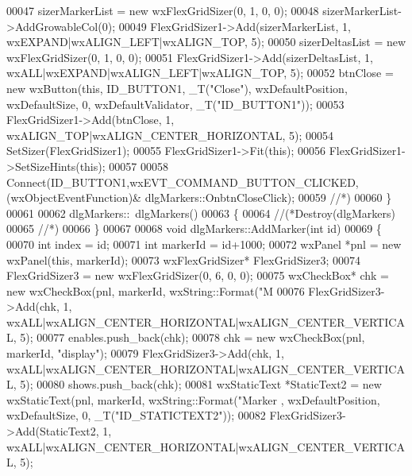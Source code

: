 \begin{DoxyCode}
00047     sizerMarkerList = \textcolor{keyword}{new} wxFlexGridSizer(0, 1, 0, 0);
00048     sizerMarkerList->AddGrowableCol(0);
00049     FlexGridSizer1->Add(sizerMarkerList, 1, wxEXPAND|wxALIGN\_LEFT|wxALIGN\_TOP, 5);
00050     sizerDeltasList = \textcolor{keyword}{new} wxFlexGridSizer(0, 1, 0, 0);
00051     FlexGridSizer1->Add(sizerDeltasList, 1, wxALL|wxEXPAND|wxALIGN\_LEFT|wxALIGN\_TOP, 5);
00052     btnClose = \textcolor{keyword}{new} wxButton(\textcolor{keyword}{this}, ID_BUTTON1, \_T(\textcolor{stringliteral}{"Close"}), wxDefaultPosition, wxDefaultSize, 0, 
      wxDefaultValidator, \_T(\textcolor{stringliteral}{"ID\_BUTTON1"}));
00053     FlexGridSizer1->Add(btnClose, 1, wxALIGN\_TOP|wxALIGN\_CENTER\_HORIZONTAL, 5);
00054     SetSizer(FlexGridSizer1);
00055     FlexGridSizer1->Fit(\textcolor{keyword}{this});
00056     FlexGridSizer1->SetSizeHints(\textcolor{keyword}{this});
00057 
00058     Connect(ID_BUTTON1,wxEVT\_COMMAND\_BUTTON\_CLICKED,(wxObjectEventFunction)&
      dlgMarkers::OnbtnCloseClick);
00059     \textcolor{comment}{//*)}
00060 \}
00061 
00062 dlgMarkers::~dlgMarkers()
00063 \{
00064     \textcolor{comment}{//(*Destroy(dlgMarkers)}
00065     \textcolor{comment}{//*)}
00066 \}
00067 
00068 \textcolor{keywordtype}{void} dlgMarkers::AddMarker(\textcolor{keywordtype}{int} \textcolor{keywordtype}{id})
00069 \{
00070     \textcolor{keywordtype}{int} index = id;
00071     \textcolor{keywordtype}{int} markerId = \textcolor{keywordtype}{id}+1000;
00072     wxPanel *pnl = \textcolor{keyword}{new} wxPanel(\textcolor{keyword}{this}, markerId);
00073     wxFlexGridSizer* FlexGridSizer3;
00074     FlexGridSizer3 = \textcolor{keyword}{new} wxFlexGridSizer(0, 6, 0, 0);
00075     wxCheckBox* chk = \textcolor{keyword}{new} wxCheckBox(pnl, markerId, wxString::Format(\textcolor{stringliteral}{"M%
00076     FlexGridSizer3->Add(chk, 1, wxALL|wxALIGN\_CENTER\_HORIZONTAL|wxALIGN\_CENTER\_VERTICAL, 5);
00077     enables.push\_back(chk);
00078     chk = \textcolor{keyword}{new} wxCheckBox(pnl, markerId, \textcolor{stringliteral}{"display"});
00079     FlexGridSizer3->Add(chk, 1, wxALL|wxALIGN\_CENTER\_HORIZONTAL|wxALIGN\_CENTER\_VERTICAL, 5);
00080     shows.push\_back(chk);
00081     wxStaticText *StaticText2 = \textcolor{keyword}{new} wxStaticText(pnl, markerId, wxString::Format(\textcolor{stringliteral}{"Marker%
      , wxDefaultPosition, wxDefaultSize, 0, \_T(\textcolor{stringliteral}{"ID\_STATICTEXT2"}));
00082     FlexGridSizer3->Add(StaticText2, 1, wxALL|wxALIGN\_CENTER\_HORIZONTAL|wxALIGN\_CENTER\_VERTICAL, 5);
}}
\end{DoxyCode}
